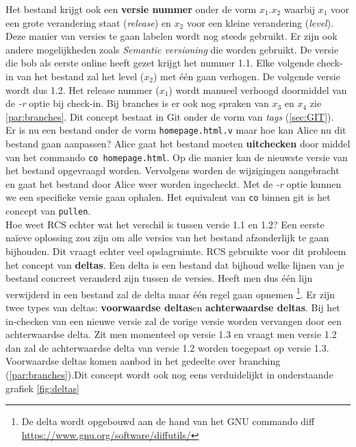 Het bestand krijgt ook een \textbf{versie nummer} onder de vorm $x_1.x_2$ waarbij $x_1$ voor een grote verandering staat (\textit{release}) en $x_2$ voor een kleine verandering (\textit{level}). Deze manier van versies te gaan labelen wordt nog steeds gebruikt. Er zijn ook andere mogelijkheden zoals \textit{Semantic versioning} die worden gebruikt. De versie die bob als eerste online heeft gezet krijgt het nummer 1.1. Elke volgende check-in van het bestand zal het level ($x_2$) met één gaan verhogen. De volgende versie wordt dus 1.2. Het release nummer ($x_1$) wordt manueel verhoogd doormiddel van de \textit{-r} optie bij check-in. Bij branches is er ook nog spraken van $x_3$ en $x_4$ zie \ref{par:branches}. Dit concept bestaat in Git onder de vorm van \textit{tags} (\ref{sec:GIT}).\\

Er is nu een bestand onder de vorm \Verb+homepage.html.v+ maar hoe kan Alice nu dit bestand gaan aanpassen? Alice gaat het bestand moeten \textbf{uitchecken} door middel van het commando  \verb+co homepage.html+. Op die manier kan de nieuwste versie van het bestand opgevraagd worden. Vervolgens worden de wijzigingen aangebracht en gaat het bestand door Alice weer worden ingecheckt. Met de \textit{-r} optie kunnen we een specifieke versie gaan ophalen. Het equivalent van \verb+co+ binnen git is het concept van \verb+pullen+.\\

Hoe weet RCS echter wat het verschil is tussen versie 1.1 en 1.2? Een eerste naïeve oplossing zou zijn om alle versies van het bestand afzonderlijk te gaan bijhouden. Dit vraagt echter veel opslagruimte. RCS gebruikte voor dit probleem het concept van \textbf{deltas}. Een delta is een bestand dat bijhoud welke lijnen van je bestand concreet veranderd zijn tussen de versies. Heeft men dus één lijn verwijderd in een bestand zal de delta maar één regel gaan opnemen \footnote{De delta wordt opgebouwd aan de hand van het GNU commando diff \url{https://www.gnu.org/software/diffutils/}}. Er zijn twee types van deltas: \textbf{voorwaardse deltas}en \textbf{achterwaardse deltas}. Bij het in-checken van een nieuwe versie zal de vorige versie worden vervangen door een achterwaardse  delta. Zit men momenteel op versie 1.3 en  vraagt men versie 1.2 dan zal de achterwaardse delta van versie 1.2 worden toegepast op versie 1.3. Voorwaardse deltas komen aanbod in het gedeelte over branching (\ref{par:branches}).Dit concept wordt ook nog eens verduidelijkt in onderstaande grafiek \ref{fig:deltas}\\

